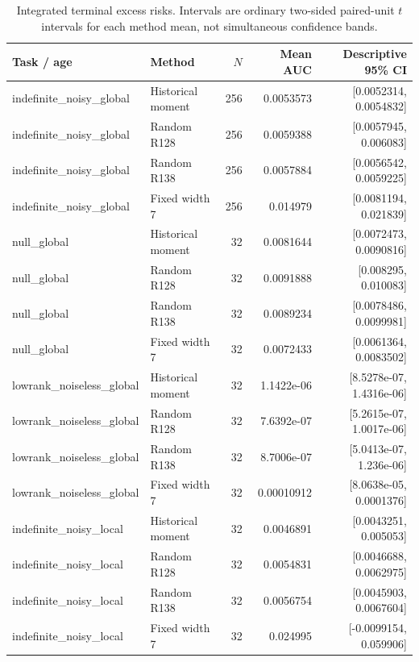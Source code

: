 \begin{table}[t]\centering\small
\begin{tabular}{llrrr}
\hline
Task / age & Method & $N$ & Mean AUC & Descriptive 95\% CI \\
\hline
indefinite\_noisy\_global & Historical moment & 256 & 0.0053573 & [0.0052314, 0.0054832] \\
indefinite\_noisy\_global & Random R128 & 256 & 0.0059388 & [0.0057945, 0.006083] \\
indefinite\_noisy\_global & Random R138 & 256 & 0.0057884 & [0.0056542, 0.0059225] \\
indefinite\_noisy\_global & Fixed width 7 & 256 & 0.014979 & [0.0081194, 0.021839] \\
null\_global & Historical moment & 32 & 0.0081644 & [0.0072473, 0.0090816] \\
null\_global & Random R128 & 32 & 0.0091888 & [0.008295, 0.010083] \\
null\_global & Random R138 & 32 & 0.0089234 & [0.0078486, 0.0099981] \\
null\_global & Fixed width 7 & 32 & 0.0072433 & [0.0061364, 0.0083502] \\
lowrank\_noiseless\_global & Historical moment & 32 & 1.1422e-06 & [8.5278e-07, 1.4316e-06] \\
lowrank\_noiseless\_global & Random R128 & 32 & 7.6392e-07 & [5.2615e-07, 1.0017e-06] \\
lowrank\_noiseless\_global & Random R138 & 32 & 8.7006e-07 & [5.0413e-07, 1.236e-06] \\
lowrank\_noiseless\_global & Fixed width 7 & 32 & 0.00010912 & [8.0638e-05, 0.0001376] \\
indefinite\_noisy\_local & Historical moment & 32 & 0.0046891 & [0.0043251, 0.005053] \\
indefinite\_noisy\_local & Random R128 & 32 & 0.0054831 & [0.0046688, 0.0062975] \\
indefinite\_noisy\_local & Random R138 & 32 & 0.0056754 & [0.0045903, 0.0067604] \\
indefinite\_noisy\_local & Fixed width 7 & 32 & 0.024995 & [-0.0099154, 0.059906] \\
\hline\end{tabular}
\caption{Integrated terminal excess risks. Intervals are ordinary two-sided paired-unit $t$ intervals for each method mean, not simultaneous confidence bands.}
\label{tab:p6auc}\end{table}
